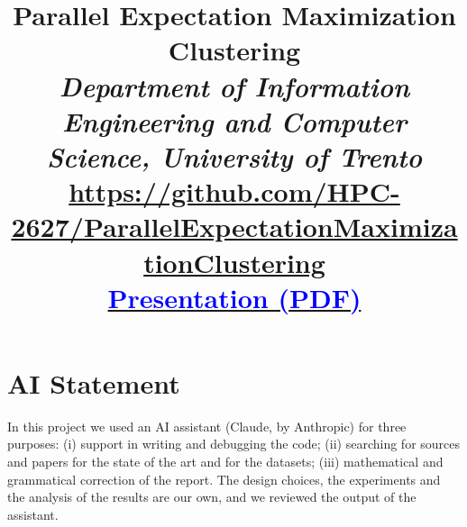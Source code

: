 \documentclass[conference,onecolumn]{IEEEtran}
\begin{document}
\pagestyle{plain} %

\title{Parallel Expectation Maximization Clustering\\
{\normalsize\normalfont\itshape Department of Information Engineering and Computer Science, University of Trento}\\
{\normalsize\normalfont\url{https://github.com/HPC-2627/ParallelExpectationMaximizationClustering}}\\
{\normalsize\normalfont \href{https://github.com/HPC-2627/ParallelExpectationMaximizationClustering/blob/main/doc/presentation/Group6-Presentation.pdf}{\textcolor{blue}{Presentation (PDF)}}}}

\author{
\and
{}
}

\maketitle
\thispagestyle{plain} %

\section*{AI Statement}
In this project we used an AI assistant (Claude, by Anthropic) for three purposes: (i) support in writing and debugging the code; (ii) searching for sources and papers for the state of the art and for the datasets; (iii) mathematical and grammatical correction of the report. The design choices, the experiments and the analysis of the results are our own, and we reviewed the output of the assistant.
\end{document}
